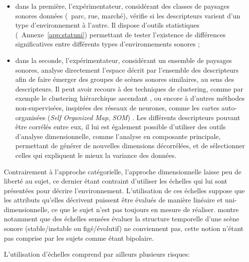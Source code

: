 {\begin{itemize}
\begin{itemize}
\item dans la première, l'expérimentateur, considérant des classes de paysages sonores données (\eg~parc, rue, marché), vérifie si les descripteurs varient d'un type d'environnement à l'autre. Il dispose d'outils statistiques (\cf~Annexe~\ref{app:statuni}) permettant de tester l'existence de différences significatives entre différents types d'environnements sonores \citep{hong2013designing};
\item dans la seconde, l'expérimentateur, considérant un ensemble de paysages sonores, analyse directement l'espace décrit par l'ensemble des descripteurs afin de faire émerger des groupes de scènes sonores similaires, au sens des descripteurs. Il peut avoir recours à des techniques de clustering, comme par exemple le clustering hiérarchique ascendant \citep{torija2013application}, ou encore à d'autres méthodes non-supervisées, inspirées des réseaux de neurones, comme les cartes auto-organisées (\emph{Self Organized Map}, \emph{SOM}) \citep{ricciardi2015sound}. Les différents descripteurs pouvant être corrélés entre eux, il lui est également possible d'utiliser des outils d'analyse dimensionnelle, comme l'analyse en composante principale, permettant de générer de nouvelles dimensions décorrélées, et de sélectionner celles qui expliquent le mieux la variance des données.
\end{itemize}

\end{itemize}

Contrairement à l'approche catégorielle, l'approche dimensionnelle laisse peu de liberté au sujet, ce dernier étant contraint d'utiliser les échelles qui lui sont présentées pour décrire l'environnement. L'utilisation de ces échelles suppose que les attributs qu'elles décrivent puissent être évalués de manière linéaire et uni-dimensionnelle, ce que le sujet n'est pas toujours en mesure de réaliser. \citep{raimbault2006qualitative} montre notamment que des échelles sensées évaluer la structure temporelle d'une scène sonore (stable/instable ou figé/évolutif) ne conviennent pas, cette notion n'étant pas comprise par les sujets comme étant bipolaire.

L'utilisation d'échelles comprend par ailleurs plusieurs risques:

}
